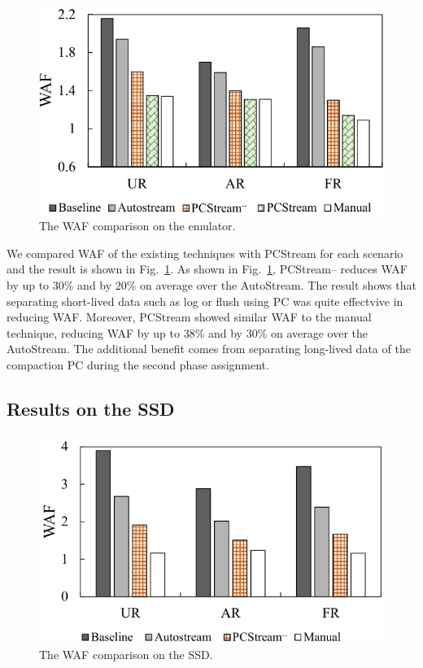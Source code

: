 \begin{figure}[t]
	\centering
	\includegraphics[width=1\linewidth]{figure/result_emul}
	\vspace{-10pt}
	\caption{The WAF comparison on the emulator.}
	\label{fig:result_emul}
	\vspace{-15pt}
\end{figure}

We compared WAF of the existing techniques with {\sf PCStream}
for each scenario and the result is shown in Fig.~\ref{fig:result_emul}. 
As shown in Fig.~\ref{fig:result_emul}, 
{\sf PCStream--} reduces WAF by up to 30\% and by 20\% on average
over the AutoStream. 
The result shows that separating short-lived data such as log or flush
using PC was quite effectvive in reducing WAF.
Moreover, {\sf PCStream} showed similar WAF to the manual technique,
reducing WAF by up to 38\% and by 30\% on average
over the AutoStream.
The additional benefit comes from separating
long-lived data of the compaction PC during the
second phase assignment.

\subsection{Results on the SSD}
\begin{figure}[t]
	\centering
	\includegraphics[width=1\linewidth]{figure/result_ssd}
	\vspace{-10pt}
	\caption{The WAF comparison on the SSD.}
	\label{fig:result_SSD}
	\vspace{-15pt}
\end{figure}

